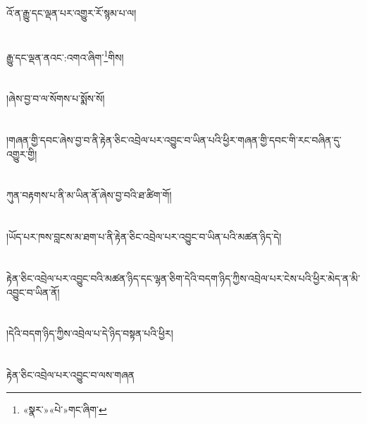 འོ་ན་རྒྱུ་དང་ལྡན་པར་འགྱུར་རོ་སྙམ་པ་ལ།\chapter{ }རྒྱུ་དང་ལྡན་ནའང་:འགའ་ཞིག་\footnote{«སྣར་»«པེ་»གང་ཞིག་}གིས།\chapter{ }།ཞེས་བྱ་བ་ལ་སོགས་པ་སྨོས་སོ།\chapter{ }།གཞན་གྱི་དབང་ཞེས་བྱ་བ་ནི་རྟེན་ཅིང་འབྲེལ་པར་འབྱུང་བ་ཡིན་པའི་ཕྱིར་གཞན་གྱི་དབང་གི་རང་བཞིན་དུ་འགྱུར་གྱི།\chapter{ }ཀུན་བརྟགས་པ་ནི་མ་ཡིན་ནོ་ཞེས་བྱ་བའི་ཐ་ཚིག་གོ།\chapter{ }།ཡོད་པར་ཁས་བླངས་མ་ཐག་པ་ནི་རྟེན་ཅིང་འབྲེལ་པར་འབྱུང་བ་ཡིན་པའི་མཚན་ཉིད་དེ།\chapter{ }རྟེན་ཅིང་འབྲེལ་པར་འབྱུང་བའི་མཚན་ཉིད་དང་ལྷན་ཅིག་དེའི་བདག་ཉིད་ཀྱིས་འབྲེལ་པར་ངེས་པའི་ཕྱིར་མེད་ན་མི་འབྱུང་བ་ཡིན་ནོ།\chapter{ }།དེའི་བདག་ཉིད་ཀྱིས་འབྲེལ་པ་དེ་ཉིད་བསྟན་པའི་ཕྱིར།\chapter{ }རྟེན་ཅིང་འབྲེལ་པར་འབྱུང་བ་ལས་གཞན